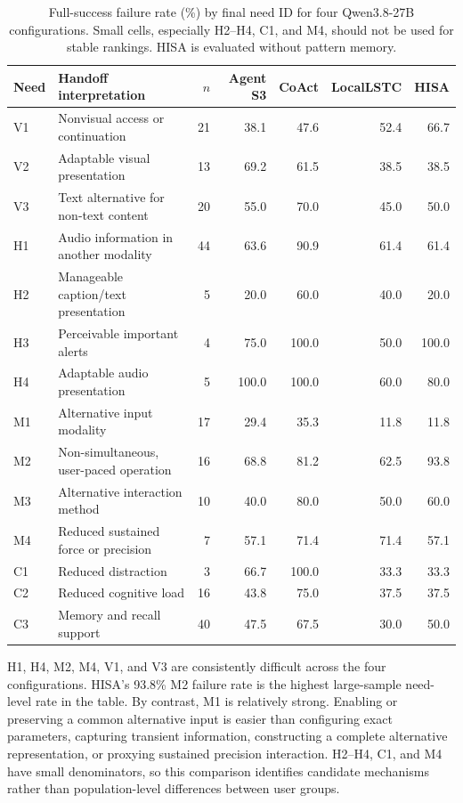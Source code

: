 \documentclass[11pt]{article}
\begin{document}
\begin{table}[t]
\centering
\small
\begin{tabular}{llrrrrr}
\toprule
Need & Handoff interpretation & $n$ & Agent S3 & CoAct & LocalLSTC & HISA \\
\midrule
V1 & Nonvisual access or continuation & 21 & 38.1 & 47.6 & 52.4 & 66.7 \\
V2 & Adaptable visual presentation & 13 & 69.2 & 61.5 & 38.5 & 38.5 \\
V3 & Text alternative for non-text content & 20 & 55.0 & 70.0 & 45.0 & 50.0 \\
H1 & Audio information in another modality & 44 & 63.6 & 90.9 & 61.4 & 61.4 \\
H2 & Manageable caption/text presentation & 5 & 20.0 & 60.0 & 40.0 & 20.0 \\
H3 & Perceivable important alerts & 4 & 75.0 & 100.0 & 50.0 & 100.0 \\
H4 & Adaptable audio presentation & 5 & 100.0 & 100.0 & 60.0 & 80.0 \\
M1 & Alternative input modality & 17 & 29.4 & 35.3 & 11.8 & 11.8 \\
M2 & Non-simultaneous, user-paced operation & 16 & 68.8 & 81.2 & 62.5 & 93.8 \\
M3 & Alternative interaction method & 10 & 40.0 & 80.0 & 50.0 & 60.0 \\
M4 & Reduced sustained force or precision & 7 & 57.1 & 71.4 & 71.4 & 57.1 \\
C1 & Reduced distraction & 3 & 66.7 & 100.0 & 33.3 & 33.3 \\
C2 & Reduced cognitive load & 16 & 43.8 & 75.0 & 37.5 & 37.5 \\
C3 & Memory and recall support & 40 & 47.5 & 67.5 & 30.0 & 50.0 \\
\bottomrule
\end{tabular}
\caption{Full-success failure rate (\%) by final need ID for four Qwen3.8-27B configurations. Small cells, especially H2--H4, C1, and M4, should not be used for stable rankings. HISA is evaluated without pattern memory.}
\label{tab:need-failure-rates}
\end{table}

H1, H4, M2, M4, V1, and V3 are consistently difficult across the four configurations. HISA's 93.8\% M2 failure rate is the highest large-sample need-level rate in the table. By contrast, M1 is relatively strong. Enabling or preserving a common alternative input is easier than configuring exact parameters, capturing transient information, constructing a complete alternative representation, or proxying sustained precision interaction. H2--H4, C1, and M4 have small denominators, so this comparison identifies candidate mechanisms rather than population-level differences between user groups.
\end{document}
